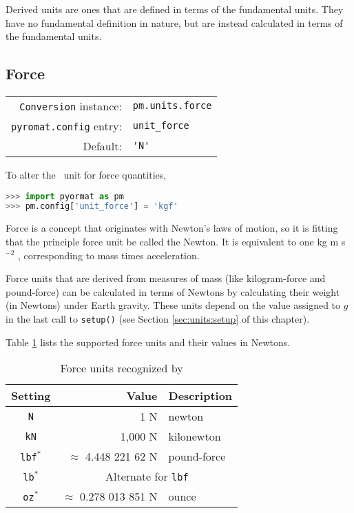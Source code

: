 Derived units are ones that are defined in terms of the fundamental units.  They have no fundamental definition in nature, but are instead calculated in terms of the fundamental units.

%
%

\subsection{Force}\label{sec:units:force}

\begin{tabular}{rl}
\hline
\verb|Conversion| instance: & \verb|pm.units.force|\\
\verb|pyromat.config| entry: & \verb|unit_force|\\
Default: & \verb|'N'|\\
\hline
\end{tabular}
\vspace{1em}

To alter the \PM\ unit for force quantities,
\begin{lstlisting}[language=Python]
>>> import pyormat as pm
>>> pm.config['unit_force'] = 'kgf'
\end{lstlisting}

Force is a concept that originates with Newton's laws of motion, so it is fitting that the principle force unit be called the Newton.  It is equivalent to one kg m s$^{-2}$ \cite[p.137]{si:2019}, corresponding to mass times acceleration.

Force units that are derived from measures of mass (like kilogram-force and pound-force) can be calculated in terms of Newtons by calculating their weight (in Newtons) under Earth gravity.  These units depend on the value assigned to $g$ in the last call to \verb|setup()| (see Section \ref{sec:units:setup} of this chapter).

Table \ref{tab:force} lists the supported force units and their values in Newtons.

\begin{table}
\centering
\caption{Force units recognized by \PM}\label{tab:force}
\begin{tabular}{crl}
\hline
Setting & Value & Description\\
\hline
\verb|N| & 1 N & newton\\
\verb|kN| & 1,000 N & kilonewton\\
\verb|lbf|$^*$ & $\approx$ 4.448 221 62 N & pound-force\\
\verb|lb|$^*$ & \multicolumn{2}{c}{Alternate for \texttt{lbf}}\\
\verb|oz|$^*$ & $\approx$ 0.278 013 851 N & ounce\\
\hline
\end{tabular}
\end{table}

